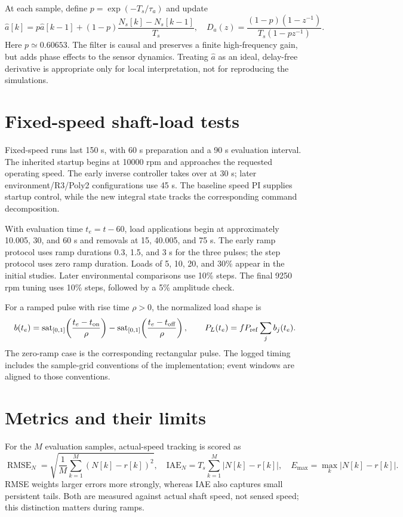 \documentclass[11pt,a4paper,oneside]{report}
\newcommand{\sat}{\operatorname{sat}}
\newcommand{\RMSE}{\operatorname{RMSE}}
\begin{document}
At each sample, define $p=\exp(-T_s/\tau_a)$ and update
\begin{equation}
\hat a[k]=p\hat a[k-1]+(1-p)\frac{N_s[k]-N_s[k-1]}{T_s},\quad
D_a(z)=\frac{(1-p)(1-z^{-1})}{T_s(1-pz^{-1})}.
\label{eq:filter}
\end{equation}
Here $p\simeq0.60653$. The filter is causal and preserves a finite high-frequency gain, but adds phase effects to the sensor dynamics. Treating $\hat a$ as an ideal, delay-free derivative is appropriate only for local interpretation, not for reproducing the simulations.

\section{Fixed-speed shaft-load tests}
Fixed-speed runs last 150 s, with 60 s preparation and a 90 s evaluation interval. The inherited startup begins at 10000 rpm and approaches the requested operating speed. The early inverse controller takes over at 30 s; later environment/R3/Poly2 configurations use 45 s. The baseline speed PI supplies startup control, while the new integral state tracks the corresponding command decomposition.

With evaluation time $t_e=t-60$, load applications begin at approximately 10.005, 30, and 60 s and removals at 15, 40.005, and 75 s. The early ramp protocol uses ramp durations 0.3, 1.5, and 3 s for the three pulses; the step protocol uses zero ramp duration. Loads of 5, 10, 20, and 30\% appear in the initial studies. Later environmental comparisons use 10\% steps. The final 9250 rpm tuning uses 10\% steps, followed by a 5\% amplitude check.

For a ramped pulse with rise time $\rho>0$, the normalized load shape is
\begin{equation}
b(t_e)=\sat_{[0,1]}\!\left(\frac{t_e-t_{\rm on}}{\rho}\right)
-\sat_{[0,1]}\!\left(\frac{t_e-t_{\rm off}}{\rho}\right),\qquad
P_L(t_e)=f P_{\rm ref}\sum_j b_j(t_e).
\end{equation}
The zero-ramp case is the corresponding rectangular pulse. The logged timing includes the sample-grid conventions of the implementation; event windows are aligned to those conventions.

\section{Metrics and their limits}
For the $M$ evaluation samples, actual-speed tracking is scored as
\begin{equation}
\RMSE_N=\sqrt{\frac1M\sum_{k=1}^M(N[k]-r[k])^2},\quad
\mathrm{IAE}_N=T_s\sum_{k=1}^M|N[k]-r[k]|,\quad
E_{\max}=\max_k|N[k]-r[k]|.
\end{equation}
RMSE weights larger errors more strongly, whereas IAE also captures small persistent tails. Both are measured against actual shaft speed, not sensed speed; this distinction matters during ramps.
\end{document}
